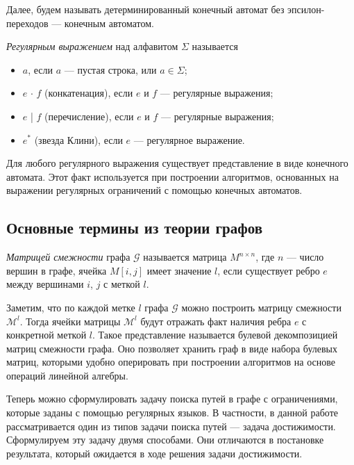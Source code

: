 Далее, будем называть детерминированный конечный автомат без эпсилон-переходов --- конечным автоматом.

\begin{rudefinition} \emph{Регулярным выражением} над алфавитом $\Sigma$ называется
    \begin{itemize}
        \item $a$, если $a$ --- пустая строка, или $a \in \Sigma$;
        \item $e$ $\cdot$ $f$ (конкатенация), если $e$ и $f$ --- регулярные выражения;
        \item $e$ | $f$ (перечисление), если $e$ и $f$ --- регулярные выражения;
        \item $e^*$ (звезда Клини), если $e$ --- регулярное выражение.
    \end{itemize}
\end{rudefinition}

Для любого регулярного выражения существует представление в виде конечного автомата. Этот факт используется при построении алгоритмов, основанных на выражении регулярных ограничений с помощью конечных автоматов.

\subsection{Основные термины из теории графов}

\begin{rudefinition}\emph{Матрицей смежности} графа $\mathcal{G}$ называется матрица $M^{n \times n}$, где $n$ --- число вершин в графе, ячейка $M[i, j]$ имеет значение $l$, если существует ребро $e$ между вершинами $i$, $j$ с меткой $l$.
\end{rudefinition}

Заметим, что по каждой метке $l$ графа $\mathcal{G}$ можно построить матрицу смежности $\mathcal{M}^l$. Тогда ячейки матрицы $\mathcal{M}^l$ будут отражать факт наличия ребра $e$ с конкретной меткой $l$. Такое представление называется булевой декомпозицией матриц смежности графа. Оно позволяет хранить граф в виде набора булевых матриц, которыми удобно оперировать при построении алгоритмов на основе операций линейной алгебры.

Теперь можно сформулировать задачу поиска путей в графе с ограничениями, которые заданы с помощью регулярных языков. В частности, в данной работе рассматривается один из типов задачи поиска путей --- задача достижимости. Сформулируем эту задачу двумя способами. Они
отличаются в постановке результата, который ожидается в ходе решения задачи достижимости.

